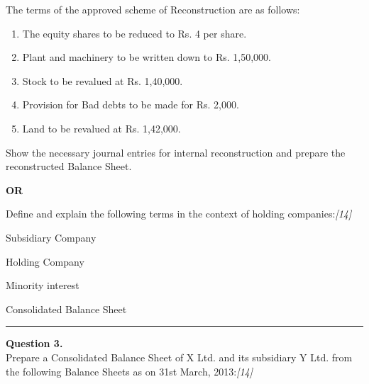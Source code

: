 \documentclass[11pt,a4paper]{article}
\newcommand{\pts}[1]{\hfill   \textit{[#1]}}
\begin{document}
The terms of the approved scheme of Reconstruction are as follows:

\begin{enumerate}[label=(\roman*),itemsep=2pt,topsep=2pt]
  \item The equity shares to be reduced to Rs. 4 per share.
  \item Plant and machinery to be written down to Rs. 1,50,000.
  \item Stock to be revalued at Rs. 1,40,000.
  \item Provision for Bad debts to be made for Rs. 2,000.
  \item Land to be revalued at Rs. 1,42,000.
\end{enumerate}
Show the necessary journal entries for internal reconstruction and prepare the reconstructed Balance Sheet.

\centerline{   \textbf{OR}}

Define and explain the following terms in the context of holding companies:\pts{14}

\begin{parts}
  \item Subsidiary Company
  \item Holding Company
  \item Minority interest
  \item Consolidated Balance Sheet
\end{parts}

\medskip\rule{\linewidth}{0.2pt}

\pagebreak




\noindent   \textbf{Question 3.} \\
Prepare a Consolidated Balance Sheet of X Ltd. and its subsidiary Y Ltd. from the following Balance Sheets as on 31st March, 2013:\pts{14}
\end{document}
